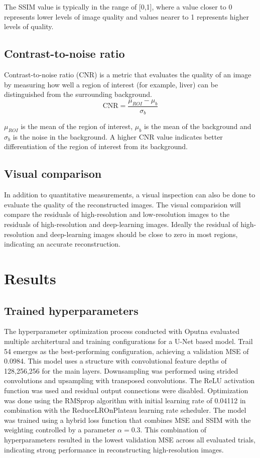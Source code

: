 \documentclass[twocolumn]{article}
\begin{document}
 The SSIM value is typically in the range of [0,1], where a value closer to 0 represents lower levels of image quality and values nearer to 1 represents higher levels of quality. \cite{dosselmann-2009}

 \subsection{Contrast-to-noise ratio}
 Contrast-to-noise ratio (CNR) is a metric that evaluates the quality of an image by measuring how well a region of interest (for example, liver) can be distinguished from the surrounding background.
\begin{equation}\label{CNR}
\text{CNR}=\frac{\mu_{ROI}-\mu_b}{\sigma_b}
\end{equation}

$\mu_{ROI}$ is the mean of the region of interest, $\mu_b$ is the mean of the background and $\sigma_b$ is the noise in the background.
A higher CNR value indicates better differentiation of the region of interest from its background.

\subsection{Visual comparison}
In addition to quantitative measurements, a visual inspection can also be done to evaluate the quality of the reconstructed images. The visual comparision will compare the residuals of high-resolution and low-resolution images to the residuals of high-resolution and deep-learning images. Ideally the residual of high-resolution and deep-learning images should be close to zero in most regions, indicating an accurate reconstruction. 
\section{Results}

\subsection{Trained hyperparameters}
The hyperparameter optimization process conducted with Oputna evaluated multiple architertural and training configurations for a U-Net based model. Trail 54 emerges as the best-performing configuration, achieving a validation MSE of 0.0984. 
This model uses a structure with convolutional feature depths of 128,256,256 for the main layers. Downsampling was performed using strided convolutions and upsampling with transposed convolutions. The ReLU activation function was used and residual output connections were disabled. Optimization was done using the RMSprop algorithm with initial learning rate of 0.04112 in combination with the ReduceLROnPlateau learning rate scheduler. The model was trained using a hybrid loss function that combines MSE and SSIM with the weighting controlled by a parameter $\alpha=0.3$.
This combination of hyperparameters resulted in the lowest validation MSE across all evaluated trials, indicating strong performance in reconstructing high-resolution images. 
\end{document}

